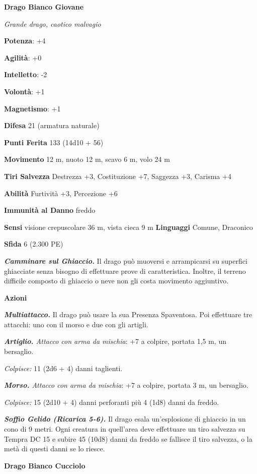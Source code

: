 \begin{multicols}{2}
\textbf{Drago Bianco Giovane}

\emph{Grande drago, caotico malvagio}

\textbf{Potenza}: +4

\textbf{Agilità}: +0



\textbf{Intelletto}: -2

\textbf{Volontà}: +1

\textbf{Magnetismo}: +1

\textbf{Difesa} 21 (armatura naturale)

\textbf{Punti Ferita} 133 (14d10 + 56)

\textbf{Movimento} 12 m, nuoto 12 m, scavo 6 m, volo 24 m

\textbf{Tiri Salvezza} Destrezza +3, Costituzione +7, Saggezza +3,
Carisma +4

\textbf{Abilità} Furtività +3, Percezione +6

\textbf{Immunità al Danno} freddo

\textbf{Sensi} visione crepuscolare 36 m, vista cieca 9 m
\textbf{Linguaggi} Comune, Draconico

\textbf{Sfida} 6 (2.300 PE)

\emph{\textbf{Camminare sul Ghiaccio.}} Il drago può muoversi e
arrampicarsi su superfici ghiacciate senza bisogno di effettuare prove
di caratteristica. Inoltre, il terreno difficile composto di ghiaccio o
neve non gli costa movimento aggiuntivo.

\textbf{Azioni}

\emph{\textbf{Multiattacco.}} Il drago può usare la sua Presenza
Spaventosa. Poi effettuare tre attacchi: uno con il morso e due con gli
artigli.

\emph{\textbf{Artiglio.} Attacco con arma da mischia}: +7 a colpire,
portata 1,5 m, un bersaglio.

\emph{Colpisce:} 11 (2d6 + 4) danni taglienti.

\emph{\textbf{Morso.} Attacco con arma da mischia}: +7 a colpire,
portata 3 m, un bersaglio.

\emph{Colpisce:} 15 (2d10 + 4) danni perforanti più 4 (1d8) danni da
freddo.

\emph{\textbf{Soffio Gelido (Ricarica 5-6).}} Il drago esala
un'esplosione di ghiaccio in un cono di 9 metri. Ogni creatura in
quell'area deve effettuare un tiro salvezza su Tempra DC 15 e
subire 45 (10d8) danni da freddo se fallisce il tiro salvezza, o la metà
di questi danni se lo riesce.

\textbf{Drago Bianco Cucciolo}


\end{multicols}
